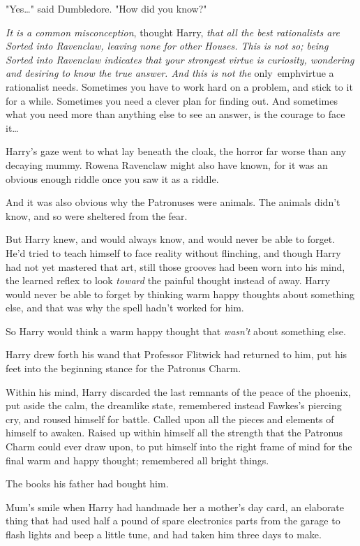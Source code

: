 "Yes{\ldots}" said Dumbledore. "How did you know?"

\emph{It is a common misconception}, thought Harry, \emph{that all the best 
rationalists are Sorted into Ravenclaw, leaving none for other Houses. This is 
not so; being Sorted into Ravenclaw indicates that your strongest virtue is 
curiosity, wondering and desiring to know the true answer. And this is not the} 
only\ emph{virtue a rationalist needs. Sometimes you have to work hard on a 
problem, and stick to it for a while. Sometimes you need a clever plan for 
finding out. And sometimes what you need more than anything else to see an 
answer, is the courage to face it{\ldots}}

Harry's gaze went to what lay beneath the cloak, the horror far worse than any 
decaying mummy. Rowena Ravenclaw might also have known, for it was an obvious 
enough riddle once you saw it as a riddle.

And it was also obvious why the Patronuses were animals. The animals didn't 
know, and so were sheltered from the fear.

But Harry knew, and would always know, and would never be able to forget. He'd 
tried to teach himself to face reality without flinching, and though Harry had 
not yet mastered that art, still those grooves had been worn into his mind, the 
learned reflex to look \emph{toward} the painful thought instead of away. Harry 
would never be able to forget by thinking warm happy thoughts about something 
else, and that was why the spell hadn't worked for him.

So Harry would think a warm happy thought that \emph{wasn't} about something 
else.

Harry drew forth his wand that Professor Flitwick had returned to him, put his 
feet into the beginning stance for the Patronus Charm.

Within his mind, Harry discarded the last remnants of the peace of the phoenix, 
put aside the calm, the dreamlike state, remembered instead Fawkes's piercing 
cry, and roused himself for battle. Called upon all the pieces and elements of 
himself to awaken. Raised up within himself all the strength that the Patronus 
Charm could ever draw upon, to put himself into the right frame of mind for the 
final warm and happy thought; remembered all bright things.

The books his father had bought him.

Mum's smile when Harry had handmade her a mother's day card, an elaborate thing 
that had used half a pound of spare electronics parts from the garage to flash 
lights and beep a little tune, and had taken him three days to make.

